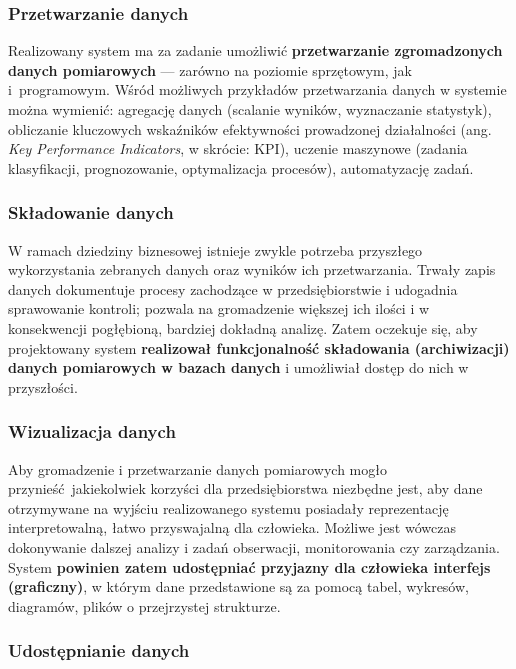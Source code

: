 \documentclass[a4paper, 12pt, twoside]{article}
\begin{document}
\subsubsection{Przetwarzanie danych}

Realizowany system ma za zadanie umożliwić \textbf{przetwarzanie zgromadzonych danych pomiarowych}
--- zarówno na poziomie sprzętowym, jak i~programowym. Wśród możliwych przykładów
przetwarzania danych w systemie można wymienić: agregację danych
(scalanie wyników, wyznaczanie statystyk),
obliczanie kluczowych wskaźników efektywności prowadzonej działalności
(ang. \emph{Key Performance Indicators}, w skrócie: KPI), uczenie maszynowe
(zadania klasyfikacji, prognozowanie, optymalizacja procesów), automatyzację zadań.

\subsubsection{Składowanie danych}

W ramach dziedziny biznesowej istnieje zwykle potrzeba przyszłego wykorzystania
zebranych danych oraz wyników ich przetwarzania. Trwały zapis danych dokumentuje
procesy zachodzące w przedsiębiorstwie i udogadnia sprawowanie kontroli; pozwala
na gromadzenie większej ich ilości i w konsekwencji pogłębioną, bardziej dokładną
analizę. Zatem oczekuje się, aby projektowany system \textbf{realizował
      funkcjonalność składowania (archiwizacji) danych pomiarowych w bazach danych}
i umożliwiał dostęp do nich w przyszłości.

\subsubsection{Wizualizacja danych}

Aby gromadzenie i przetwarzanie danych pomiarowych mogło przynieść jakiekolwiek
korzyści dla przedsiębiorstwa niezbędne jest, aby dane otrzymywane na wyjściu realizowanego
systemu posiadały reprezentację interpretowalną, łatwo przyswajalną dla człowieka.
Możliwe jest wówczas dokonywanie dalszej analizy i zadań obserwacji, monitorowania
czy zarządzania. System \textbf{powinien zatem udostępniać przyjazny dla człowieka
      interfejs (graficzny)}, w którym dane przedstawione są za pomocą tabel, wykresów,
diagramów, plików o przejrzystej strukturze.

\subsubsection{Udostępnianie danych}
\end{document}
